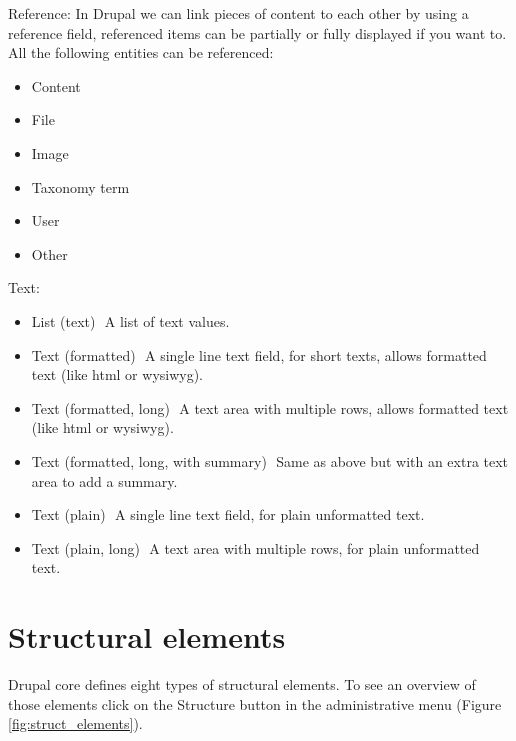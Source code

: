 Reference: 
In Drupal we can link pieces of content to each other by using a reference field, referenced items can be partially or fully displayed if you want to. All the following entities can be referenced: 
\begin{itemize}  
    \item Content 
    \item File 
    \item Image 
    \item Taxonomy term 
    \item User 
    \item Other 
\end{itemize}

Text:
\begin{itemize}
    \item List (text) ­ A list of text values. 
    \item Text (formatted) ­ A single line text field, for short texts, allows formatted text (like html or wysiwyg). 
    \item Text (formatted, long) ­ A text area with multiple rows, allows formatted text (like html or wysiwyg). 
    \item Text (formatted, long, with summary) ­ Same as above but with an extra text area to add a summary. 
    \item Text (plain) ­ A single line text field, for plain unformatted text. 
    \item Text (plain, long) ­ A text area with multiple rows, for plain unformatted text. 
\end{itemize}


\section{Structural elements}
Drupal core defines eight types of structural elements. To see an overview of those elements click on the Structure button in the administrative menu (Figure \ref{fig:struct_elements}).

